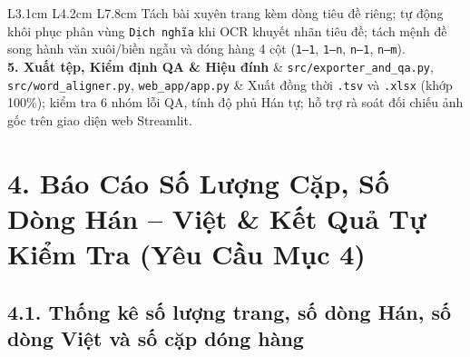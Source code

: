 \documentclass[11pt,a4paper]{article}
\begin{document}
\begin{table}[h!]
\begin{tabular}{L{3.1cm} L{4.2cm} L{7.8cm}}
Tách bài xuyên trang kèm dòng tiêu đề riêng; tự động khôi phục phân vùng \texttt{Dịch nghĩa} khi OCR khuyết nhãn tiêu đề; tách mệnh đề song hành văn xuôi/biền ngẫu và dóng hàng 4 cột (\texttt{1--1}, \texttt{1--n}, \texttt{n--1}, \texttt{n--m}). \\
\addlinespace[0.25em]
\textbf{5. Xuất tệp, Kiểm định QA \& Hiệu đính} &
\texttt{src/exporter\_and\_qa.py}, \texttt{src/word\_aligner.py}, \texttt{web\_app/app.py} &
Xuất đồng thời \texttt{.tsv} và \texttt{.xlsx} (khớp 100\%); kiểm tra 6 nhóm lỗi QA, tính độ phủ Hán tự; hỗ trợ rà soát đối chiếu ảnh gốc trên giao diện web Streamlit. \\
\bottomrule
\end{tabular}
\caption{Ngăn xếp công cụ và kiến trúc pipeline xử lý của nhóm \texttt{CV04}.}
\end{table}


\section{4. Báo Cáo Số Lượng Cặp, Số Dòng Hán -- Việt \& Kết Quả Tự Kiểm Tra (Yêu Cầu Mục 4)}

\subsection{4.1. Thống kê số lượng trang, số dòng Hán, số dòng Việt và số cặp dóng hàng}
\end{document}

